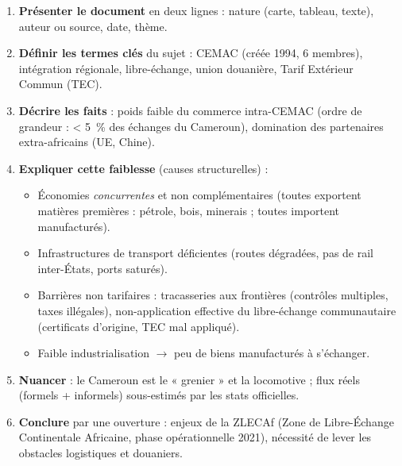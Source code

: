 \documentclass[11pt]{article}
\newcommand{\cle}[1]{{\popxbold\color{popdark}#1}}
\begin{document}
\begin{methode}
\begin{enumerate}
\item \textbf{Présenter le document} en deux lignes : nature (carte, tableau, texte), auteur ou source, date, thème.
\item \textbf{Définir les termes clés} du sujet : CEMAC (créée 1994, 6 membres), intégration régionale, libre-échange, union douanière, Tarif Extérieur Commun (TEC).
\item \textbf{Décrire les faits} : poids faible du commerce intra-CEMAC (ordre de grandeur : \SI{< 5}{\%} des échanges du Cameroun), domination des partenaires extra-africains (UE, Chine).
\item \textbf{Expliquer cette faiblesse} (causes structurelles) :
    \begin{itemize}
    \item Économies \emph{concurrentes} et non complémentaires (toutes exportent matières premières : pétrole, bois, minerais ; toutes importent manufacturés).
    \item Infrastructures de transport déficientes (routes dégradées, pas de rail inter-États, ports saturés).
    \item Barrières non tarifaires : tracasseries aux frontières (contrôles multiples, taxes illégales), non-application effective du libre-échange communautaire (certificats d'origine, TEC mal appliqué).
    \item Faible industrialisation $\rightarrow$ peu de biens manufacturés à s'échanger.
    \end{itemize}
\item \textbf{Nuancer} : le Cameroun est le « grenier » et la locomotive ; flux réels (formels + informels) sous-estimés par les stats officielles.
\item \textbf{Conclure} par une ouverture : enjeux de la \cle{ZLECAf} (Zone de Libre-Échange Continentale Africaine, phase opérationnelle 2021), nécessité de lever les obstacles logistiques et douaniers.
\end{enumerate}
\end{methode}
\end{document}
